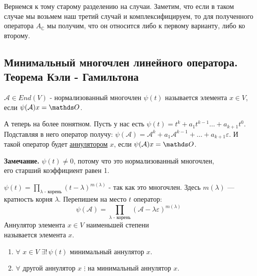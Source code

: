 Вернемся к тому старому разделению на случаи. Заметим, что если в таком случае мы возьмем наш третий случай и комплексифицируем, то для полученного оператора $A_{\mathbb{C}}$ мы получим, что он относится либо к первому варианту, либо ко второму.

\subsection{Минимальный многочлен линейного оператора. Теорема Кэли - Гамильтона}

 $\mathcal{A}\in End(V)$ - нормализованный многочлен $\psi(t)$ называется  элемента $x \in V$, если $\psi(\mathcal{A}) x = \zero$.

А теперь на более понятном. Пусть у нас есть  $\psi(t) = t^k +a_1t^{k-1} \ldots +a_{k+1}t^0$. Подставляя в него оператор получу: $\psi(\mathcal{A}) = \mathcal{A}^k +a_1\mathcal{A}^{k-1}+\ldots + a_{k+1}\varepsilon$. И такой оператор будет \uline{аннулятором} $x$, если $\psi(\mathcal{A})x = \zero$.

\textbf{Замечание.} $\psi(t) \neq 0$, потому что это нормализованный многочлен, \\ его старший коэффициент равен 1.

$\psi(t) = \prod\limits_{\lambda \text{ - корень}}(t-\lambda)^{m(\lambda)}$ -  так как это многочлен. Здесь $m(\lambda)$ --- кратность корня $\lambda$. Перепишем на место $t$ оператор:
$$\psi(\mathcal{A} ) = \prod\limits_{\lambda \text{ - корень} }(\mathcal{A} -\lambda  \varepsilon)^{m(\lambda)}$$
 Аннулятор элемента $x\in V$ наименьшей степени \\ называется  элемента $x$. 

\begin{enumerate}
    \item $\forall $ $x \in V $ $ \exists! \, \psi(t)$ минимальный аннулятор $x$.
    \item $\forall$ другой аннулятор $x$  $\vdots$ на минимальный аннулятор $x$.
\end{enumerate}

